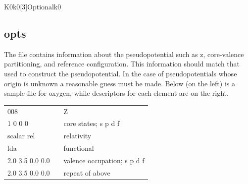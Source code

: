 \documentclass[11pt]{report}
\begin{document}
\begin{Card}{K0}{k0[3]}{Optional}{k0}


\subsection{opts}
\label{opts}
The  file contains information about the pseudopotential such as z, core-valence partitioning, and reference configuration. This information should match that used to construct the pseudopotential. In the case of pseudopotentials 
whose origin is unknown a reasonable guess must be made. Below (on the left) is a sample  file for oxygen, while descriptors for each element are on the right.

\begin{center}
\begin{tabular}{| l | c l |}
\hline
008				& &  Z\\
1 0 0 0			& & core states; s p d f \\
scalar rel			& & relativity \\
lda				& & functional \\
2.0 3.5 0.0 0.0		& & valence occupation; s p d f \\
2.0 3.5 0.0 0.0		& & repeat of above \\
\hline
\end{tabular}
\end{center}


\end{Card}
\end{document}
